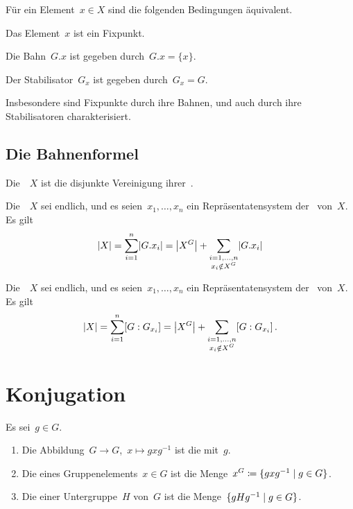 \begin{proposition}
  Für ein Element~$x \in X$ sind die folgenden Bedingungen äquivalent.
  \begin{equivlist}
    \item
      Das Element~$x$ ist ein Fixpunkt.
    \item
      Die Bahn~$G.x$ ist gegeben durch~$G.x = \{ x \}$.
    \item
      Der Stabilisator~$G_x$ ist gegeben durch~$G_x = G$.
  \end{equivlist}
  Insbesondere sind Fixpunkte durch ihre Bahnen, und auch durch ihre Stabilisatoren charakterisiert.
\end{proposition}



\subsection{Die Bahnenformel}

\begin{proposition}
  Die~~$X$ ist die disjunkte Vereinigung ihrer~.
\end{proposition}

\begin{corollary}
  Die~~$X$ sei endlich, und es seien~$x_1, \dotsc, x_n$ ein Repräsentatensystem der~ von~$X$.
  Es gilt
  \[
    \card{X}
    =
    \sum_{i=1}^n \card{G.x_i}
    =
    \card*{X^G}
    +
    \sum_{\substack{i=1, \dotsc, n \\ x_i \notin X^G}}
    \card{G.x_i}
  \]
\end{corollary}

\begin{theorem}[Bahnenformel]
  Die~~$X$ sei endlich, und es seien~$x_1, \dotsc, x_n$ ein Repräsentatensystem der~ von~$X$.
  Es gilt
  \[
    \card{X}
    =
    \sum_{i=1}^n [G : G_{x_i}]
    =
    \card*{X^G}
    +
    \sum_{\substack{i=1, \dotsc, n \\ x_i \notin X^G}}
    [G : G_{x_i}] \,.
  \]
\end{theorem}



\section{Konjugation}

\begin{definition}
  Es sei~$g \in G$.
  \begin{enumerate}
    \item
      Die Abbildung~$G \to G$,~$x \mapsto g x g^{-1}$ ist die  mit~$g$.
    \item
      Die  eines Gruppenelements~$x \in G$ ist die Menge~$x^G \defined \{ g x g^{-1} \suchthat g \in G \}$.
    \item
      Die  einer Untergruppe~$H$ von~$G$ ist die Menge~$\{ g H g^{-1} \suchthat g \in G \}$.
  \end{enumerate}
\end{definition}

